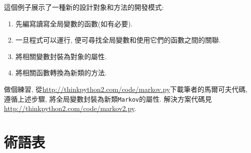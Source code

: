 \documentclass[10pt]{book}
\begin{document}
這個例子展示了一種新的設計對象和方法的開發模式:

\begin{enumerate}

\item 先編寫讀寫全局變數的函數(如有必要).

\item 一旦程式可以運行, 便可尋找全局變數和使用它們的函數之間的關聯.

\item 將相關變數封裝為對象的屬性.

\item 將相關函數轉換為新類的方法.

\end{enumerate}

做個練習, 從\url{http://thinkpython2.com/code/markov.py}下載筆者的馬爾可夫代碼, 
遵循上述步驟, 將全局變數封裝為新類{\tt Markov}的屬性. 
解決方案代碼見\url{http://thinkpython2.com/code/markov2.py}.



\section{術語表}
\end{document}
